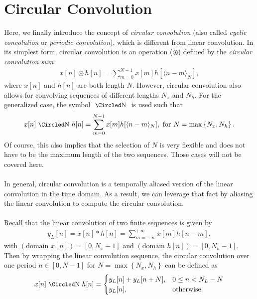 \documentclass{report}
\begin{document}
\section{Circular Convolution}
Here, we finally introduce the concept of \emph{circular convolution} (also called \emph{cyclic convolution} or \emph{periodic convolution}), which is different from linear convolution. 
In its simplest form, circular convolution is an operation ($\circledast$) defined by the \emph{circular convolution sum}
\begin{align}
    x[n] \circledast h[n] = \sum_{m=0}^{N-1}x[m]h[\langle n-m\rangle_N],
\end{align}
where $x[n]$ and $h[n]$ are both length-$N$. However, circular convolution also allows for convolving sequences of different lengths $N_x$ and $N_h$. For the generalized case, the symbol $\circconv{N}$ 
is used such that 
\begin{align}
    x[n] \circconv{N} h[n] = \sum_{m=0}^{N-1}x[m]h[\langle n-m\rangle_N], \text{ for } N = \max\left\{N_x,N_h\right\}.
\end{align}
Of course, this also implies that the selection of $N$ is very flexible and does not have to be the maximum length of the two sequences. Those cases will not be covered here.
\\ \\
In general, circular convolution is a temporally aliased version of the linear convolution in the time domain. As a result, we can leverage that fact by aliasing the linear convolution 
to compute the circular convolution.
\\ \\
Recall that the linear convolution of two finite sequences is given by
\begin{align}
    y_L[n] = x[n] * h[n] = \sum_{m=-\infty}^{+\infty}x[m]h[n-m],
\end{align}
with $(\text{domain }x[n])=[0,N_x-1]$ and $(\text{domain }h[n])=[0,N_h-1]$. Then by wrapping the linear convolution sequence, the circular convolution over one period $n\in[0,N-1]$ for $N=\max\left\{N_x,N_h\right\}$ can be defined as 
\begin{align}
    x[n] \circconv{N} h[n] = 
    \begin{cases}
        y_L[n] + y_L[n+N], & 0 \leq n < N_L-N \\
        y_L[n], & \text{otherwise}.
    \end{cases}
\end{align}
\end{document}
